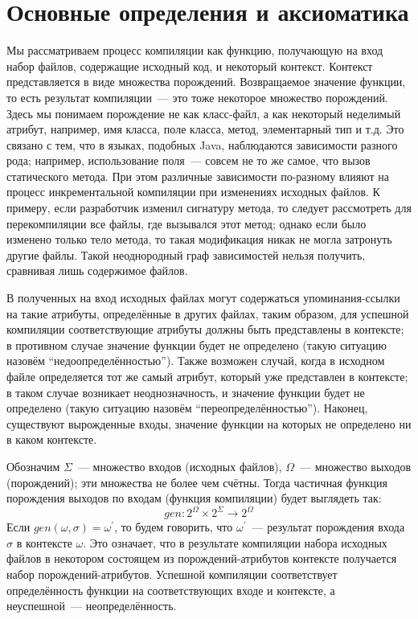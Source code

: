 \section{Основные определения и аксиоматика}

Мы рассматриваем процесс компиляции как функцию, получающую на вход набор файлов, содержащие исходный код, и некоторый контекст. Контекст представляется в виде множества порождений. Возвращаемое значение функции, то есть результат компиляции~--- это тоже некоторое множество порождений. Здесь мы понимаем порождение не как класс-файл, а как некоторый неделимый атрибут, например, имя класса, поле класса, метод, элементарный тип и т.д. Это связано с тем, что в языках, подобных Java, наблюдаются зависимости разного рода; например, использование поля~--- совсем не то же самое, что вызов статического метода. При этом различные зависимости по-разному влияют на процесс инкрементальной компиляции при изменениях исходных файлов. К примеру, если разработчик изменил сигнатуру метода, то следует рассмотреть для перекомпиляции все файлы, где вызывался этот метод; однако если было изменено только тело метода, то такая модификация никак не могла затронуть другие файлы. Такой неоднородный граф зависимостей нельзя получить, сравнивая лишь содержимое файлов.

В полученных на вход исходных файлах могут содержаться упоминания-ссылки на такие атрибуты, определённые в других файлах, таким образом, для успешной компиляции соответствующие атрибуты должны быть представлены в контексте; в противном случае значение функции будет не определено (такую ситуацию назовём ``недоопределённостью''). Также возможен случай, когда в исходном файле определяется тот же самый атрибут, который уже представлен в контексте; в таком случае возникает неоднозначность, и значение функции будет не определено (такую ситуацию назовём ``переопределённостью''). Наконец, существуют вырожденные входы, значение функции на которых не определено ни в каком контексте.

Обозначим $\Sigma$~--- множество входов (исходных файлов), $\Omega$~--- множество выходов (порождений); эти множества не более чем счётны. Тогда частичная функция порождения выходов по входам (функция компиляции) будет выглядеть так:
$$gen : 2^\Omega \times 2^\Sigma \to 2^\Omega$$
Если $gen(\omega, \sigma) = \omega^\prime$, то будем говорить, что $\omega^\prime$~--- результат порождения входа $\sigma$ в контексте $\omega$. Это означает, что в результате компиляции набора исходных файлов в некотором состоящем из порождений-атрибутов контексте получается набор порождений-атрибутов. Успешной компиляции соответствует определённость функции на соответствующих входе и контексте, а неуспешной~--- неопределённость.

